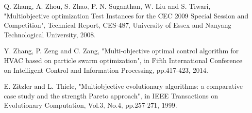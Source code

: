 \begin{thebibliography}{99}
     Q. Zhang, A. Zhou, S. Zhao, P. N. Suganthan, W. Liu and S. Tiwari, "Multiobjective optimization Test Instances for the CEC 2009 Special Session and Competition", Technical Report, CES-487, University of Essex and Nanyang Technological University, 2008.

     Y. Zhang, P. Zeng and C. Zang, "Multi-objective optimal control algorithm for HVAC based on particle swarm optimization", in Fifth International Conference on Intelligent Control and Information Processing, pp.417-423, 2014.

     E. Zitzler and L. Thiele, "Multiobjective evolutionary algorithms: a comparative case study and the strength Pareto approach", in IEEE Transactions on Evolutionary Computation, Vol.3, No.4, pp.257-271, 1999.

\end{thebibliography}
